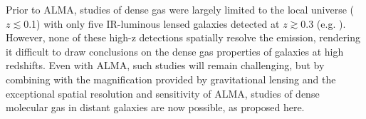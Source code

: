 \documentclass[12pt,a4paper]{article}
\newcommand{\rarr}{$\rightarrow$}
\newcommand{\bco}{\mbox{CO($J$=2\rarr1)}\xspace}
\newcommand{\Fig}[1]{Fig.~\ref{fig:#1}}
\begin{document}
Prior to ALMA, studies of dense gas were largely limited to the local universe ($z\lesssim$0.1) 
with only five IR-luminous lensed galaxies detected at $z\gtrsim0.3$ 
(e.g. \citealt{Riechers06a, Riechers07a, Riechers10a, Wagg05a, Gao07a}).
However, none of these high-z detections spatially resolve the emission, rendering it difficult 
to draw conclusions on the dense gas properties of galaxies at high redshifts. 
Even with ALMA, such studies will remain challenging, but by combining with
the magnification provided by gravitational lensing and the exceptional spatial resolution and sensitivity of ALMA, studies
of dense molecular gas in distant galaxies are now possible, as proposed here.

\vspace{-0.7em}
\end{document}
